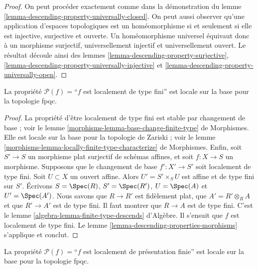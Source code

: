 \begin{proof}
On peut procéder exactement comme dans la démonstration du
lemme \ref{lemma-descending-property-universally-closed}. On peut aussi
observer qu'une application d'espaces topologiques est un homéomorphisme si
et seulement si elle est injective, surjective et ouverte. Un homéomorphisme
universel équivaut donc à un morphisme surjectif, universellement injectif et
universellement ouvert. Le résultat découle ainsi des lemmes
\ref{lemma-descending-property-surjective},
\ref{lemma-descending-property-universally-injective} et
\ref{lemma-descending-property-universally-open}.
\end{proof}

\begin{lemma}
\label{lemma-descending-property-locally-finite-type}
La propriété $\mathcal{P}(f) =$``$f$ est localement de type fini'' est locale
sur la base pour la topologie fpqc.
\end{lemma}

\begin{proof}
La propriété d'être localement de type fini est stable par changement de base ;
voir le lemme \ref{morphisms-lemma-base-change-finite-type} de Morphismes. Elle est
locale sur la base pour la topologie de Zariski ; voir le lemme
\ref{morphisms-lemma-locally-finite-type-characterize} de Morphismes. Enfin, soit
$S' \to S$ un morphisme plat surjectif de schémas affines, et soit
$f : X \to S$ un morphisme. Supposons que le changement de base
$f' : X' \to S'$ soit localement de type fini. Soit $U \subset X$ un ouvert
affine. Alors $U' = S' \times_S U$ est affine et de type fini sur $S'$.
Écrivons $S = \Spec(R)$, $S' = \Spec(R')$, $U = \Spec(A)$ et
$U' = \Spec(A')$. Nous savons que $R \to R'$ est fidèlement plat, que
$A' = R' \otimes_R A$ et que $R' \to A'$ est de type fini. Il faut montrer
que $R \to A$ est de type fini. C'est le lemme
\ref{algebra-lemma-finite-type-descends} d'Algèbre. Il s'ensuit que $f$ est localement
de type fini. Le lemme \ref{lemma-descending-properties-morphisms}
s'applique et conclut.
\end{proof}

\begin{lemma}
\label{lemma-descending-property-locally-finite-presentation}
La propriété $\mathcal{P}(f) =$``$f$ est localement de présentation finie''
est locale sur la base pour la topologie fpqc.
\end{lemma}

